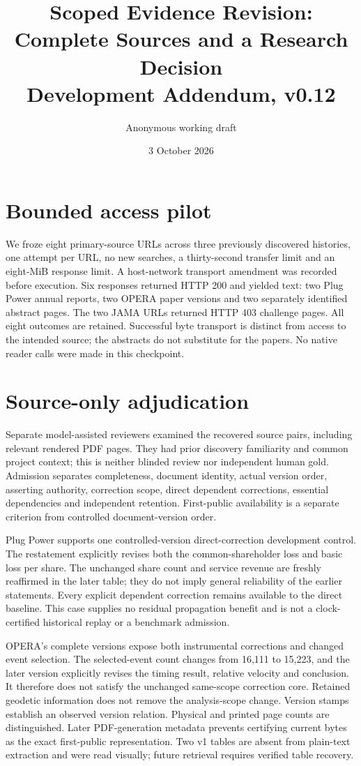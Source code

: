 \documentclass[11pt]{article}
\title{Scoped Evidence Revision: Complete Sources and a Research Decision\\Development Addendum, v0.12}
\author{Anonymous working draft}
\date{3 October 2026}
\begin{document}
\maketitle

\section{Bounded access pilot}\label{sec:v12access}
We froze eight primary-source URLs across three previously discovered histories,
one attempt per URL, no new searches, a thirty-second transfer limit and an
eight-MiB response limit. A host-network transport amendment was recorded before
execution. Six responses returned HTTP 200 and yielded text: two Plug Power
annual reports, two OPERA paper versions and two separately identified abstract
pages. The two JAMA URLs returned HTTP 403 challenge pages. All eight outcomes
are retained. Successful byte transport is distinct from access to the intended
source; the abstracts do not substitute for the papers. No native reader calls
were made in this checkpoint.

\section{Source-only adjudication}\label{sec:v12review}
Separate model-assisted reviewers examined the recovered source pairs, including
relevant rendered PDF pages. They had prior discovery familiarity and common
project context; this is neither blinded review nor independent human gold.
Admission separates completeness, document identity, actual version order,
asserting authority, correction scope, direct dependent corrections, essential
dependencies and independent retention. First-public availability is a separate
criterion from controlled document-version order.

Plug Power supports one controlled-version direct-correction development
control. The restatement explicitly revises both the common-shareholder loss
and basic loss per share. The unchanged share count and service revenue are
freshly reaffirmed in the later table; they do not imply general reliability of
the earlier statements. Every explicit dependent correction remains available
to the direct baseline. This case supplies no residual propagation benefit and
is not a clock-certified historical replay or a benchmark admission.

OPERA's complete versions expose both instrumental corrections and changed
event selection. The selected-event count changes from 16,111 to 15,223, and the
later version explicitly revises the timing result, relative velocity and
conclusion. It therefore does not satisfy the unchanged same-scope correction
core. Retained geodetic information does not remove the analysis-scope change.
Version stamps establish an observed version relation. Physical and printed
page counts are distinguished. Later PDF-generation
metadata prevents certifying current bytes as the exact first-public
representation. Two v1 tables are absent from plain-text extraction and were
read visually; future retrieval requires verified table recovery.
\end{document}
